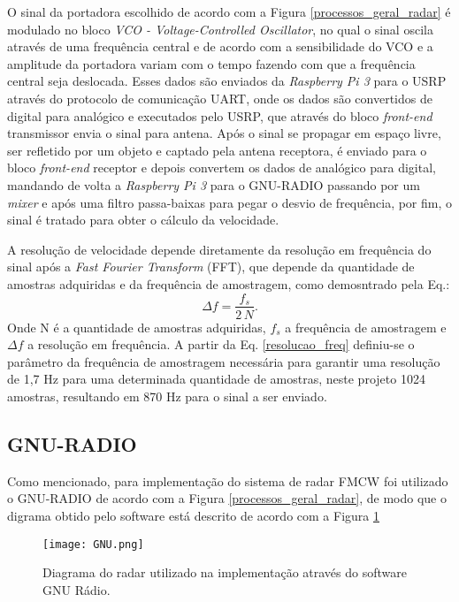 O sinal da portadora escolhido de acordo com a Figura \ref{processos_geral_radar} é modulado no bloco \emph{VCO - Voltage-Controlled Oscillator}, no qual o sinal oscila através de uma frequência central e de acordo com a sensibilidade do VCO e a amplitude da portadora variam com o tempo fazendo com que a frequência central seja deslocada. Esses dados são enviados da \emph{Raspberry Pi 3} para o USRP através do protocolo de comunicação UART, onde os dados são convertidos de digital para analógico e executados pelo USRP, que através do bloco \emph{front-end} transmissor envia o sinal para antena. Após o sinal se propagar em espaço livre, ser refletido por um objeto e captado pela antena receptora,  é enviado para o bloco \emph{front-end} receptor e depois convertem os dados de analógico para digital, mandando de volta a \emph{Raspberry Pi 3} para o GNU-RADIO passando por um \emph{mixer} e após uma filtro passa-baixas para pegar o desvio de frequência, por fim, o sinal é tratado para obter o cálculo da velocidade.



A resolução de velocidade depende diretamente da resolução em frequência do sinal após a \emph{Fast Fourier Transform} (FFT), que depende da quantidade de amostras adquiridas e da frequência de amostragem, como demosntrado pela Eq.:
\begin{equation}\label{resolucao_freq}
    \Delta f = \frac{f_{s}}{2\,N}.
\end{equation}
Onde N é a quantidade de amostras adquiridas, $f_{s}$ a frequência de amostragem e $\Delta f$ a resolução em frequência. A partir da Eq. \ref{resolucao_freq} definiu-se o parâmetro da frequência de amostragem necessária para garantir 
uma resolução de 1,7 Hz para uma determinada quantidade de amostras, neste projeto 1024 amostras, resultando em 870 Hz para o sinal a ser enviado.

\subsection{GNU-RADIO}

    Como mencionado, para implementação do sistema de radar FMCW foi utilizado o GNU-RADIO de acordo com a Figura \ref{processos_geral_radar}, de modo que o digrama obtido pelo software está descrito de acordo com a Figura \ref{GNU}

\begin{figure}[H]
    \centering
    \texttt{[image: GNU.png]}
    \caption{Diagrama do radar utilizado na implementação através do software GNU Rádio.}
    \label{GNU}
\end{figure}


